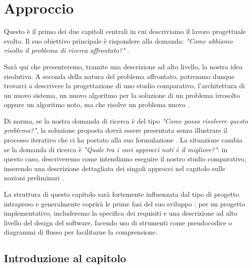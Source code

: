 \chapter{Approccio}
\label{chap:approccio}

\acresetall

Questo è il primo dei due capitoli centrali in cui descriviamo il lavoro progettuale svolto. Il suo obiettivo principale è rispondere alla domanda: \textit{"Come abbiamo risolto il problema di ricerca affrontato?"} \cite{pfandzelter2022thesis}.

\medskip

Sarà qui che presenteremo, tramite una descrizione ad alto livello, la nostra idea risolutiva. A seconda della natura del problema affrontato, potremmo dunque trovarci a descrivere la progettazione di uno studio comparativo, l'architettura di un nuovo sistema, un nuovo algoritmo per la soluzione di un problema irrosolto oppure un algoritmo noto, ma che risolve un problema nuovo \cite{pfandzelter2022thesis}.

\medskip

Di norma, se la nostra domanda di ricerca è del tipo \textit{"Come posso risolvere questo problema?"}, la soluzione proposta dovrà essere presentata senza illustrare il processo iterativo che ci ha portato alla sua formulazione \cite{pfandzelter2022thesis}. La situazione cambia se la domanda di ricerca è \textit{"Quale tra i vari approcci noti è il migliore?"}: in questo caso, descriveremo come intendiamo eseguire il nostro studio comparativo, inserendo una descrizione dettagliata dei singoli approcci nel capitolo sulle nozioni preliminari \cite{pfandzelter2022thesis}.

\medskip

La struttura di questo capitolo sarà fortemente influenzata dal tipo di progetto intrapreso e generalmente coprirà le prime fasi del suo sviluppo \cite{unibz2022thesis}: per un progetto implementativo, includeremo la specifica dei requisiti e una descrizione ad alto livello del design del software, facendo uso di strumenti come pseudocodice o diagrammi di flusso per facilitarne la comprensione.

\section{Introduzione al capitolo}

